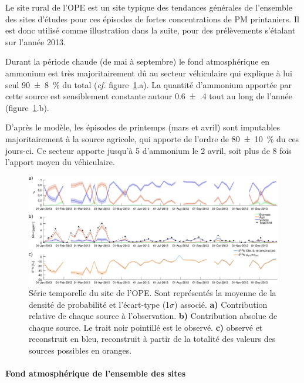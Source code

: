Le site rural de l'OPE est un site typique des tendances générales de l'ensemble des sites
d'études pour ces épisodes de fortes concentrations de PM printaniers.
Il est donc utilisé comme illustration dans la suite, pour des prélèvements s'étalant sur
l'année 2013.

Durant la période chaude (de mai à septembre) le fond atmosphérique en ammonium est très
majoritairement dû au secteur véhiculaire qui explique à lui seul \SI{90(8)}{\percent} du
\NHq{} total (\textit{cf.} figure~\ref{fig:timeSerieOPE}.a).
La quantité d'ammonium apportée par cette source est sensiblement constante autour
\SI{0.6(4)}{\ugm} tout au long de l'année (figure~\ref{fig:timeSerieOPE}.b).

D'après le modèle, les épisodes de printemps (mars et avril) sont imputables
majoritairement à la source agricole, qui apporte de l'ordre de \SI{80(10)}{\percent} du
\NHq{} ces jours-ci.  Ce secteur apporte jusqu'à \SI{5}{\ugm} d'ammonium le 2 avril, soit
plus de 8 fois l'apport moyen du véhiculaire.

\begin{figure}[ht]
    \centering
    \includegraphics[width=1.0\linewidth]{figures/INACS/MCA_OPE_S3-BioFerVeh_e-30_timeSerie2013.pdf}
    \caption{Série temporelle du site de l'OPE. Sont représentés la moyenne de la densité
        de probabilité et l'écart-type (1$\sigma$) associé. \textbf{a)} Contribution
        relative de chaque source à l'observation. \textbf{b)} Contribution absolue de
        chaque source. Le trait noir pointillé est le \NHq{} observé. \textbf{c)}
        \dN{} observé et reconstruit en bleu, \dN{} reconstruit à partir de la totalité des
        valeurs des sources possibles en oranges.
    }
    \label{fig:timeSerieOPE}
\end{figure}

\paragraph{Fond atmosphérique de l'ensemble des sites} 


